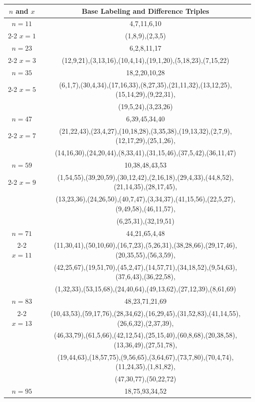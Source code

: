 \begin{tabular}{| c | c |}
\hline
\(n\) and \(x\) & Base Labeling and Difference Triples\\
\hline
\(n=11\) & 
4,7,11,6,10\\
\cline{2-2}
\(x=1\)
&(1,8,9),(2,3,5)\\
\hline 
\(n=23\) & 
6,2,8,11,17\\
\cline{2-2}
\(x=3\)
&(12,9,21),(3,13,16),(10,4,14),(19,1,20),(5,18,23),(7,15,22)\\
\hline 
\(n=35\) & 
18,2,20,10,28\\
\cline{2-2}
\(x=5\)
&(6,1,7),(30,4,34),(17,16,33),(8,27,35),(21,11,32),(13,12,25),(15,14,29),(9,22,31),\\
&(19,5,24),(3,23,26)\\
\hline 
\(n=47\) & 
6,39,45,34,40\\
\cline{2-2}
\(x=7\)
&(21,22,43),(23,4,27),(10,18,28),(3,35,38),(19,13,32),(2,7,9),(12,17,29),(25,1,26),\\
&(14,16,30),(24,20,44),(8,33,41),(31,15,46),(37,5,42),(36,11,47)\\
\hline 
\(n=59\) & 
10,38,48,43,53\\
\cline{2-2}
\(x=9\)
&(1,54,55),(39,20,59),(30,12,42),(2,16,18),(29,4,33),(44,8,52),(21,14,35),(28,17,45),\\
&(13,23,36),(24,26,50),(40,7,47),(3,34,37),(41,15,56),(22,5,27),(9,49,58),(46,11,57),\\
&(6,25,31),(32,19,51)\\
\hline 
\(n=71\) & 
44,21,65,4,48\\
\cline{2-2}
\(x=11\)
&(11,30,41),(50,10,60),(16,7,23),(5,26,31),(38,28,66),(29,17,46),(20,35,55),(56,3,59),\\
&(42,25,67),(19,51,70),(45,2,47),(14,57,71),(34,18,52),(9,54,63),(37,6,43),(36,22,58),\\
&(1,32,33),(53,15,68),(24,40,64),(49,13,62),(27,12,39),(8,61,69)\\
\hline 
\(n=83\) & 
48,23,71,21,69\\
\cline{2-2}
\(x=13\)
&(10,43,53),(59,17,76),(28,34,62),(16,29,45),(31,52,83),(41,14,55),(26,6,32),(2,37,39),\\
&(46,33,79),(61,5,66),(42,12,54),(25,15,40),(60,8,68),(20,38,58),(13,36,49),(27,51,78),\\
&(19,44,63),(18,57,75),(9,56,65),(3,64,67),(73,7,80),(70,4,74),(11,24,35),(1,81,82),\\
&(47,30,77),(50,22,72)\\
\hline 
\(n=95\) & 
18,75,93,34,52\\

\end{tabular}
